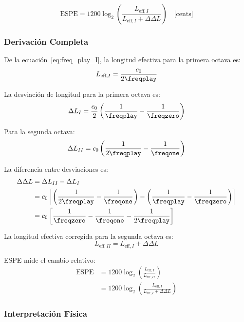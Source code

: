 \begin{equation}
\text{ESPE} = 1200 \log_2\left(\frac{L_{\text{eff},I}}{L_{\text{eff},I} + \Delta\Delta L}\right) \quad \text{[cents]}
\label{eq:espe_def}
\end{equation}

\subsubsection{Derivación Completa}

De la ecuación~\eqref{eq:freq_play_I}, la longitud efectiva para la primera octava es:
\begin{equation}
L_{\text{eff},I} = \frac{c_0}{2 \freqplay}
\end{equation}

La desviación de longitud para la primera octava es:
\begin{equation}
\Delta L_I = \frac{c_0}{2}\left(\frac{1}{\freqplay} - \frac{1}{\freqzero}\right)
\end{equation}

Para la segunda octava:
\begin{equation}
\Delta L_{II} = c_0\left(\frac{1}{2\freqplay} - \frac{1}{\freqone}\right)
\end{equation}

La diferencia entre desviaciones es:
\begin{align}
\Delta\Delta L &= \Delta L_{II} - \Delta L_I \\
&= c_0\left[\left(\frac{1}{2\freqplay} - \frac{1}{\freqone}\right) - \left(\frac{1}{\freqplay} - \frac{1}{\freqzero}\right)\right] \\
&= c_0\left[\frac{1}{\freqzero} - \frac{1}{\freqone} - \frac{1}{2\freqplay}\right]
\end{align}

La longitud efectiva corregida para la segunda octava es:
\begin{equation}
L_{\text{eff},II} = L_{\text{eff},I} + \Delta\Delta L
\end{equation}

ESPE mide el cambio relativo:
\begin{align}
\text{ESPE} &= 1200 \log_2\left(\frac{L_{\text{eff},I}}{L_{\text{eff},II}}\right) \\
&= 1200 \log_2\left(\frac{L_{\text{eff},I}}{L_{\text{eff},I} + \Delta\Delta L}\right)
\end{align}

\subsubsection{Interpretación Física}

